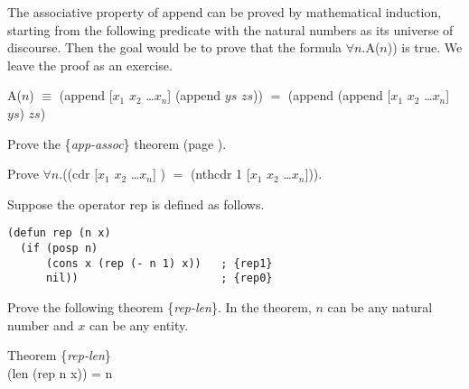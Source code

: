 The associative property of append can be proved by mathematical induction,
starting from the following predicate with the natural numbers as its
universe of discourse.
Then the goal would be to prove that the formula $\forall$$n$.A($n$)) is true.
We leave the proof as an exercise.

\begin{samepage}
\begin{center}
A($n$) $\equiv$ (append [$x_1$ $x_2$ \dots $x_n$] (append $ys$ $zs$)) $=$ (append (append [$x_1$ $x_2$ \dots $x_n$] $ys$) $zs$)
\end{center}
\end{samepage}

\begin{ExerciseList}

\Exercise Prove the \{\emph{app-assoc}\} theorem (page \pageref{app-assoc}).

\Exercise Prove $\forall n.$((cdr [$x_1$ $x_2$ \dots $x_n$] ) $=$ (nthcdr 1 [$x_1$ $x_2$ \dots $x_n$])).

\Exercise Suppose the operator rep is defined as follows.
\label{rep-equations}
\begin{Verbatim}
(defun rep (n x)
  (if (posp n)
      (cons x (rep (- n 1) x))   ; {rep1}
      nil))                      ; {rep0}
\end{Verbatim}
Prove the following theorem \{\emph{rep-len}\}.
In the theorem, $n$ can be any natural number and $x$ can be any entity.
\begin{samepage}
\label{rep-len}
\begin{center}
Theorem \{\emph{rep-len}\} \\
(len (rep n x)) = n
\end{center}
\end{samepage}


\end{ExerciseList}
